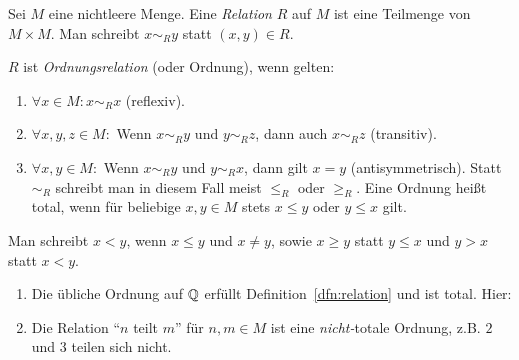 \documentclass[12pt]{scrreprt}
\begin{document}
\begin{dfn}\label{dfn:relation}
Sei $M$ eine nichtleere Menge. Eine \textit{Relation} $R$ auf $M$ ist eine Teilmenge von $M \times M$. Man schreibt $x \sim_R y$ statt $(x, y) \in R$.

$R$ ist \textit{Ordnungsrelation} (oder Ordnung), wenn gelten:
\begin{enumerate} %
\item $\forall x \in M: x \sim_R x$ (reflexiv).
\item $\forall x, y, z \in M:$ Wenn $x \sim_R y$ und $y \sim_R z$, dann auch $x \sim_R z$ (transitiv).
\item\label{dfn:relation.antisymm} $\forall x, y \in M:$ Wenn $x \sim_R y$ und $y \sim_R x$, dann gilt $x = y$ (antisymmetrisch). Statt $\sim_R$ schreibt man in diesem Fall meist $\leq_R$ oder $\geq_R$. Eine Ordnung heißt total, wenn für beliebige $x, y \in M$ stets $x \leq y$ oder $y \leq x$ gilt.
\end{enumerate}

Man schreibt $x < y$, wenn $x \leq y$ und $x \ne y$, sowie $x \geq y$ statt $y \leq x$ und $y > x$ statt $x < y$.

\begin{bsp*}
\begin{enumerate} %
\item Die übliche Ordnung auf $\mathbb{Q}$ erfüllt Definition~\ref{dfn:relation} und ist total. Hier:


\item Die Relation "`$n$ teilt $m$"' für $n, m \in M$ ist eine \textit{nicht-}totale Ordnung, z.B. $2$ und $3$ teilen sich nicht.
\end{enumerate}
\end{bsp*}
\end{dfn}
\end{document}
